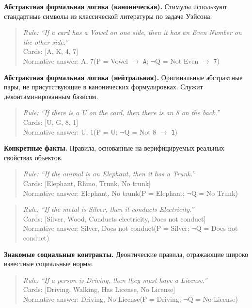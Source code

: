 \textbf{Абстрактная формальная логика (каноническая).} Стимулы используют стандартные символы из классической литературы по задаче Уэйсона.

\begin{quote}
\textit{Rule: ``If a card has a Vowel on one side, then it has an Even Number on the other side.''}\\[4pt]
Cards: [A, K, 4, 7]\\[4pt]
Normative answer: A, 7\quad (P = Vowel $\to$ \texttt{A}; $\lnot$Q = Not Even $\to$ \texttt{7})
\end{quote}

\textbf{Абстрактная формальная логика (нейтральная).} Оригинальные абстрактные пары, не присутствующие в канонических формулировках. Служит деконтаминированным базисом.

\begin{quote}
\textit{Rule: ``If there is a U on the card, then there is an 8 on the back.''}\\[4pt]
Cards: [U, G, 8, 1]\\[4pt]
Normative answer: U, 1\quad (P = U; $\lnot$Q = Not 8 $\to$ \texttt{1})
\end{quote}

\textbf{Конкретные факты.} Правила, основанные на верифицируемых реальных свойствах объектов.

\begin{quote}
\textit{Rule: ``If the animal is an Elephant, then it has a Trunk.''}\\[4pt]
Cards: [Elephant, Rhino, Trunk, No trunk]\\[4pt]
Normative answer: Elephant, No trunk\quad (P = Elephant; $\lnot$Q = No Trunk)
\end{quote}

\begin{quote}
\textit{Rule: ``If the metal is Silver, then it conducts Electricity.''}\\[4pt]
Cards: [Silver, Wood, Conducts electricity, Does not conduct]\\[4pt]
Normative answer: Silver, Does not conduct\quad (P = Silver; $\lnot$Q = Does not conduct)
\end{quote}

\textbf{Знакомые социальные контракты.} Деонтические правила, отражающие широко известные социальные нормы.

\begin{quote}
\textit{Rule: ``If a person is Driving, then they must have a License.''}\\[4pt]
Cards: [Driving, Walking, Has License, No License]\\[4pt]
Normative answer: Driving, No License\quad (P = Driving; $\lnot$Q = No License)
\end{quote}

